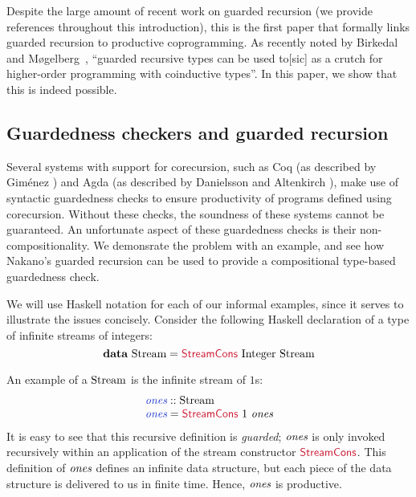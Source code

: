 Despite the large amount of recent work on guarded recursion (we
provide references throughout this introduction), this is the first
paper that formally links guarded recursion to productive
coprogramming. As recently noted by Birkedal and
M{\o}gelberg~\cite{birkedal13intensional}, ``guarded recursive types
can be used to[sic] as a crutch for higher-order programming with
coinductive types''. In this paper, we show that this is indeed
possible.

\subsection{Guardedness checkers and guarded recursion}

Several systems with support for corecursion, such as Coq (as
described by Gim{\'e}nez \cite{gimenez94codifying}) and Agda (as
described by Danielsson and Altenkirch \cite{danielsson09mixing}),
make use of syntactic guardedness checks to ensure productivity of
programs defined using corecursion. Without these checks, the
soundness of these systems cannot be guaranteed. An unfortunate aspect
of these guardedness checks is their non-compositionality. We
demonsrate the problem with an example, and see how Nakano's guarded
recursion can be used to provide a compositional type-based
guardedness check.

We will use Haskell notation for each of our informal examples, since
it serves to illustrate the issues concisely. Consider the following
Haskell declaration of a type of infinite streams of integers:
\begin{displaymath}
  \kw{data}\ \tyname{Stream} = \cons{StreamCons}\ \tyname{Integer}\ \tyname{Stream}
\end{displaymath}

An example of a $\textrm{Stream}$ is the infinite stream of $1$s:
\begin{displaymath}
  \begin{array}{l}
    \defn{ones} :: \tyname{Stream} \\
    \defn{ones} = \cons{StreamCons}\ 1\ \ident{ones}
  \end{array}
\end{displaymath}
It is easy to see that this recursive definition is \emph{guarded};
$\textit{ones}$ is only invoked recursively within an application of
the stream constructor $\cons{StreamCons}$. This definition of
$\textit{ones}$ defines an infinite data structure, but each piece of
the data structure is delivered to us in finite time. Hence,
$\textit{ones}$ is productive.


